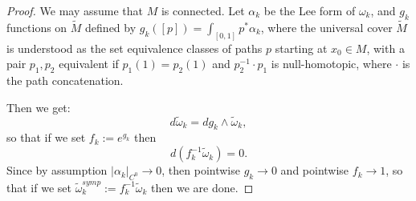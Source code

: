 \documentclass{amsart}
\numberwithin{equation}{section}
\theoremstyle{definition}
\theoremstyle{remark}
\begin{document}
\begin{proof} We may assume that $M$ is connected. Let $\alpha _{k} $ be the Lee form of $\omega _{k} $, and $g _{k}$
functions on $\widetilde{M} $ defined by $g _{k} ([p]) = \int _{[0,1]} p ^{*} \alpha _{k} $, where the universal cover $\widetilde{M} $ is understood as the set equivalence classes of paths $p$ starting at $x _{0} \in M $,
  with a pair $p _{1}, p _{2}  $ equivalent if $p _{1} (1) = p _{2} (1)  $ and $p _{2} ^{-1} \cdot p _{1}$ is null-homotopic, where $\cdot$ is the path concatenation. 



Then we get:
\begin{equation*}
   d \widetilde{\omega} _{k} = dg _{k} \wedge \widetilde{\omega} _{k},  
\end{equation*}
so that if we set $f _{k}:= e ^{g _{k}}  $ then
\begin{equation*}
   d (f ^{-1} _{k} \widetilde{\omega} _{k}) =0.
\end{equation*}
Since by assumption $|\alpha _{k}| _{C ^{0}}  \to 0$, then pointwise $g _{k} \to 0 $ and pointwise $f _{k} \to 1$, so that if we set $\widetilde{\omega} ^{symp}  _{k}:= f ^{-1} _{k} \widetilde{\omega} _{k}$ then we are done.
\end{proof}
 
\end{document}
